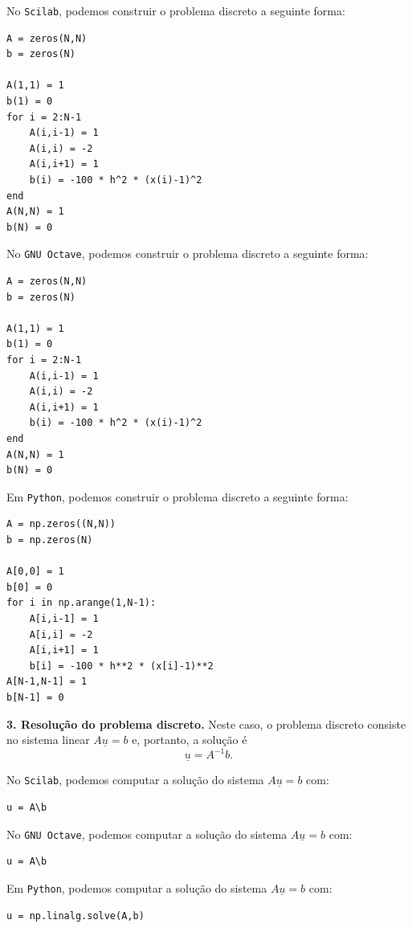 \begin{sol}
\ifisscilab
No \verb+Scilab+, podemos construir o problema discreto a seguinte forma:
\begin{verbatim}
A = zeros(N,N)
b = zeros(N)

A(1,1) = 1
b(1) = 0
for i = 2:N-1
    A(i,i-1) = 1
    A(i,i) = -2
    A(i,i+1) = 1
    b(i) = -100 * h^2 * (x(i)-1)^2
end
A(N,N) = 1
b(N) = 0
\end{verbatim}
\fi
\ifisoctave
No \verb+GNU Octave+, podemos construir o problema discreto a seguinte forma:
\begin{verbatim}
A = zeros(N,N)
b = zeros(N)

A(1,1) = 1
b(1) = 0
for i = 2:N-1
    A(i,i-1) = 1
    A(i,i) = -2
    A(i,i+1) = 1
    b(i) = -100 * h^2 * (x(i)-1)^2
end
A(N,N) = 1
b(N) = 0
\end{verbatim}
\fi
\ifispython
Em \verb+Python+, podemos construir o problema discreto a seguinte forma:
\begin{verbatim}
A = np.zeros((N,N))
b = np.zeros(N)

A[0,0] = 1
b[0] = 0
for i in np.arange(1,N-1):
    A[i,i-1] = 1
    A[i,i] = -2
    A[i,i+1] = 1
    b[i] = -100 * h**2 * (x[i]-1)**2
A[N-1,N-1] = 1
b[N-1] = 0
\end{verbatim}
\fi

{\bf 3. Resolução do problema discreto.} Neste caso, o problema discreto consiste no sistema linear $A\underline{u} = b$ e, portanto, a solução é
\begin{equation}\label{eq:pvc2_numerica}
  \underline{u} = A^{-1}b.
\end{equation}

\ifisscilab
No \verb+Scilab+, podemos computar a solução do sistema $A\underline{u} = b$ com:
\begin{verbatim}
u = A\b
\end{verbatim}
\fi
\ifisoctave
No \verb+GNU Octave+, podemos computar a solução do sistema $A\underline{u} = b$ com:
\begin{verbatim}
u = A\b
\end{verbatim}
\fi
\ifispython
Em \verb+Python+, podemos computar a solução do sistema $A\underline{u} = b$ com:
\begin{verbatim}
u = np.linalg.solve(A,b)
\end{verbatim}
\fi


\end{sol}
